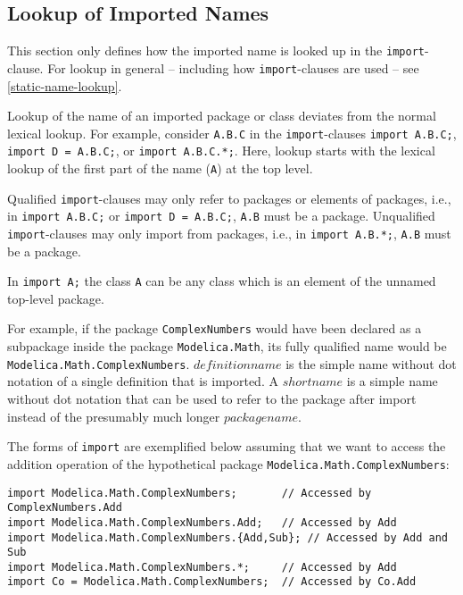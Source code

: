 \subsection{Lookup of Imported Names}\label{lookup-of-imported-names}

This section only defines how the imported name is looked up in the \lstinline!import!-clause.
For lookup in general -- including how \lstinline!import!-clauses are used -- see \cref{static-name-lookup}.

Lookup of the name of an imported package or class deviates from the normal lexical lookup.
For example, consider \lstinline!A.B.C! in the \lstinline!import!-clauses \lstinline!import A.B.C;!, \lstinline!import D = A.B.C;!, or \lstinline!import A.B.C.*;!.
Here, lookup starts with the lexical lookup of the first part of the name (\lstinline!A!) at the top level.

Qualified \lstinline!import!-clauses may only refer to packages or elements of packages, i.e., in \lstinline!import A.B.C;! or \lstinline!import D = A.B.C;!, \lstinline!A.B! must be a package.
Unqualified \lstinline!import!-clauses may only import from packages, i.e., in \lstinline!import A.B.*;!, \lstinline!A.B! must be a package.

\begin{nonnormative}
In \lstinline!import A;! the class \lstinline!A! can be any class which is an element of the unnamed top-level package.
\end{nonnormative}

\begin{nonnormative}
For example, if the package \lstinline!ComplexNumbers! would have been declared as a subpackage inside the package \lstinline!Modelica.Math!, its fully qualified name would be \lstinline!Modelica.Math.ComplexNumbers!.
$\mathit{definitionname}$ is the simple name without dot notation of a single definition that is imported.
A $\mathit{shortname}$ is a simple name without dot notation that can be used to refer to the package after import instead of the presumably much longer $\mathit{packagename}$.

The forms of \lstinline!import! are exemplified below assuming that we want to access the addition operation of the hypothetical package \lstinline!Modelica.Math.ComplexNumbers!:
\begin{lstlisting}[language=modelica]
import Modelica.Math.ComplexNumbers;       // Accessed by ComplexNumbers.Add
import Modelica.Math.ComplexNumbers.Add;   // Accessed by Add
import Modelica.Math.ComplexNumbers.{Add,Sub}; // Accessed by Add and Sub
import Modelica.Math.ComplexNumbers.*;     // Accessed by Add
import Co = Modelica.Math.ComplexNumbers;  // Accessed by Co.Add
\end{lstlisting}
\end{nonnormative}


